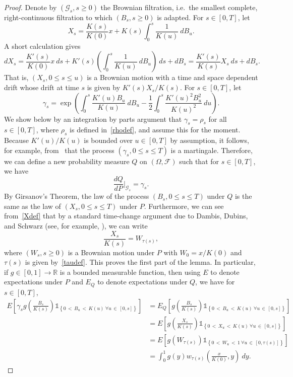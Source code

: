\documentclass[10pt]{amsart}
\theoremstyle{definition}\newtheorem{defi}[theo]{Definition}\newtheorem{rema}[theo]{Remark}\newtheorem{exam}[theo]{Example}\newtheorem{exem}[theo]{Example}\newtheorem{nota}[theo]{Notation}
\newcommand\F{\mathcal{F}}
\newcommand{\clG}{\mathcal{G}}
\newcommand*\R{\mathbb{R}}
\newcommand{\1} {\mathds{1}}
\let\oldforall\forall
\renewcommand*{\forall}{\mathrel{\oldforall}}
\begin{document}
\begin{proof}
Denote by $(\clG_s, s \geq 0)$ the Brownian filtration, i.e.~the smallest complete, right-continuous filtration to which $(B_s, s\ge0)$ is adapted. For $s \in [0, T]$, let
\begin{equation}\label{Xdef}
X_s = \frac{K(s)}{K(0)} x + K(s) \int_0^s \frac{1}{K(u)} \: dB_u.
\end{equation}
A short calculation gives
\begin{equation}\label{sdeX}
dX_s = \frac{K'(s)}{K(0)} x \: ds + K'(s) \left(\int_0^s \frac{1}{K(u)} \: dB_u\right) \: ds + dB_s = \frac{K'(s)}{K(s)} X_s \: ds + dB_s.
\end{equation}
That is, $(X_s, 0 \leq s \leq u)$ is a Brownian motion with a time and space dependent drift whose drift at time $s$ is given by $K'(s) X_s/K(s)$. For $s \in [0, T]$, let
\[
\gamma_s = \exp \left(\int_0^s \frac{K'(u) B_u}{K(u)} \: dB_u - \frac{1}{2} \int_0^s \frac{K'(u)^2 B_u^2}{K(u)^2} \: du \right).
\]
We show below by an integration by parts argument that $\gamma_s = \rho_s$ for all $s\in[0,T]$, where $\rho_s$ is defined in~\eqref{rhodef}, and assume this for the moment. Because $K'(u)/K(u)$ is bounded over $u \in [0, T]$ by assumption, it follows, for example, from~\cite[Corollary~3.5.14]{ks} that the process $(\gamma_s, 0 \leq s \leq T)$ is a martingale. Therefore, we can define a new probability measure $Q$ on $(\Omega, \F)$ such that for $s \in [0, T]$, we have
\[
\frac{dQ}{dP} \bigg|_{\clG_s} = \gamma_s.
\]
By Girsanov's Theorem, the law of the process $(B_s, 0 \leq s \leq T)$ under $Q$ is the same as the law of $(X_s, 0 \leq s \leq T)$ under $P$.
Furthermore, we can see from~\eqref{Xdef} that by a standard time-change argument due to Dambis, Dubins, and Schwarz (see, for example, \cite[Theorem~3.4.6]{ks}), we can write
\[
\frac{X_s}{K(s)} = W_{\tau(s)},
\]
where $(W_s, s \geq 0)$ is a Brownian motion under $P$ with $W_0 = x/K(0)$ and $\tau(s)$ is given by~\eqref{taudef}. This proves the first part of the lemma. In particular, if $g \in [0, 1] \rightarrow \R$ is a bounded measurable function, then using $E$ to denote expectations under $P$ and $E_Q$ to denote expectations under $Q$, we have for $s \in [0, T]$,
\begin{align*}
E \left[\gamma_s g \left(\frac{B_s}{K(s)} \right) \1_{\left\{0\,<\,B_u\,<\,K(u) \: \forall u\,\in\,[0, s]\right\}} \right] &= E_Q \left[g \left(\frac{B_s}{K(s)} \right) \1_{\left\{0\,<\,B_u\,<\,K(u) \: \forall u\,\in\,[0, s]\right\}} \right] \\
&= E \left[g \left(\frac{X_s}{K(s)} \right) \1_{\left\{0\,<\,X_u\,<\,K(u) \: \forall u\,\in\,[0, s]\right\}} \right]\\
&= E\left[g\left(W_{\tau(s)}\right) \1_{\left\{0\,< \,W_u\,<\,1 \: \forall u\,\in\,\left[0, \tau(s)\right]\right\}} \right] \\
&= \int_0^1 g(y) w_{\tau(s)}\left(\frac x {K(0)}, y\right) \: dy.
\end{align*}


\end{proof}
\end{document}
